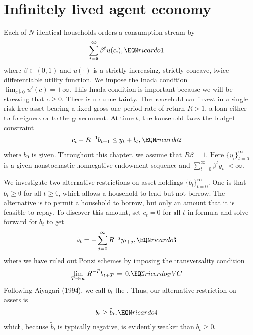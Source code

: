 \section{Infinitely lived agent economy}

Each of $N$ identical
households orders a consumption stream by
$$ \sum_{t=0}^\infty \beta^t u(c_t), \EQN ricardo1 $$
where $\beta \in (0,1)$ and $u(\cdot)$ is a strictly  increasing,
strictly concave, twice-differentiable
utility function.
We impose the Inada condition
$ \lim_{c \downarrow 0} u'(c) = +\infty.$
This Inada condition is important  because we will be stressing
that $c \geq 0$.  There is no uncertainty.
The household can invest in a single risk-free asset bearing a fixed gross
one-period rate of return $R>1$, a loan either to foreigners or to the
government.  At time $t$, the household faces the budget
constraint
$$ c_t + R^{-1} b_{t+1} \leq y_t + b_t,  \EQN ricardo2$$
where $b_0$ is given.   Throughout this chapter,
we assume that $R \beta =1$.  Here
$\{y_t\}_{t=0}^\infty$ is a given nonstochastic
nonnegative endowment sequence and
$ \sum_{t=0}^\infty \beta^t y_t$
$< \infty$.

We   investigate two alternative restrictions on asset holdings
$\{b_t\}_{t=0}^\infty$.  One is that
$b_t \geq 0$ for all $t \geq 0$, which allows
a household to lend but not borrow.  The alternative
is to  permit a household to borrow, but only an amount
that it is feasible to repay.     To discover this amount,
set $c_t=0$ for all $t$ in formula  and solve forward for
$b_t$ to get
$$ \tilde b_t = - \sum_{j=0}^\infty R^{-j} y_{t+j},   \EQN ricardo3 $$
where we have ruled out Ponzi schemes by imposing the transversality condition
$$
\lim_{T\to\infty} R^{-T} b_{t+T} \,=\, 0.            \EQN ricardo_TVC
$$
Following Aiyagari (1994),
 we call $\tilde b_t$ the
{\it {}}. Thus, our alternative restriction
on assets is
$$ b_t \geq \tilde b_t , \EQN ricardo4 $$
which, because $\tilde b_t$ is typically negative,  is evidently weaker than $b_t \geq 0$.


